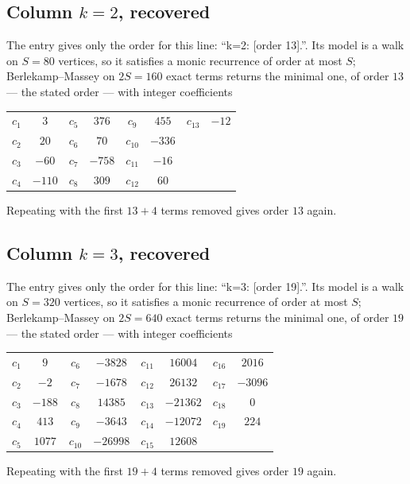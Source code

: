 \documentclass[11pt,a4paper]{article}
\theoremstyle{plain}
\theoremstyle{definition}
\begin{document}
\subsection*{Column $k=2$, recovered}
The entry gives only the order for this line: ``k=2: [order 13].''. Its model is a walk on
$S=80$ vertices, so it satisfies a monic recurrence of order at most $S$;
Berlekamp--Massey on $2S=160$ exact terms returns the minimal one, of order
$13$ --- the stated order --- with integer coefficients
\begin{center}\small\begin{tabular}{cccccccc}
$c_{1}$ & $3$ & $c_{5}$ & $376$ & $c_{9}$ & $455$ & $c_{13}$ & $-12$ \\
$c_{2}$ & $20$ & $c_{6}$ & $70$ & $c_{10}$ & $-336$ &  &  \\
$c_{3}$ & $-60$ & $c_{7}$ & $-758$ & $c_{11}$ & $-16$ &  &  \\
$c_{4}$ & $-110$ & $c_{8}$ & $309$ & $c_{12}$ & $60$ &  &  \\
\end{tabular}\end{center}
Repeating with the first $13+4$ terms removed gives order $13$ again.

\subsection*{Column $k=3$, recovered}
The entry gives only the order for this line: ``k=3: [order 19].''. Its model is a walk on
$S=320$ vertices, so it satisfies a monic recurrence of order at most $S$;
Berlekamp--Massey on $2S=640$ exact terms returns the minimal one, of order
$19$ --- the stated order --- with integer coefficients
\begin{center}\small\begin{tabular}{cccccccc}
$c_{1}$ & $9$ & $c_{6}$ & $-3828$ & $c_{11}$ & $16004$ & $c_{16}$ & $2016$ \\
$c_{2}$ & $-2$ & $c_{7}$ & $-1678$ & $c_{12}$ & $26132$ & $c_{17}$ & $-3096$ \\
$c_{3}$ & $-188$ & $c_{8}$ & $14385$ & $c_{13}$ & $-21362$ & $c_{18}$ & $0$ \\
$c_{4}$ & $413$ & $c_{9}$ & $-3643$ & $c_{14}$ & $-12072$ & $c_{19}$ & $224$ \\
$c_{5}$ & $1077$ & $c_{10}$ & $-26998$ & $c_{15}$ & $12608$ &  &  \\
\end{tabular}\end{center}
Repeating with the first $19+4$ terms removed gives order $19$ again.
\end{document}
